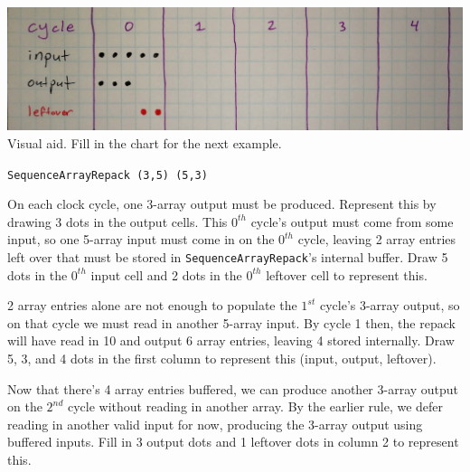 \documentclass[12pt]{article}
\begin{document}
\begin{center}
\includegraphics[width=1.0\linewidth]{Figures/sorry-if-patronizing.jpg}
Visual aid. Fill in the chart for the next example.

\texttt{SequenceArrayRepack (3,5) (5,3)}
\end{center}

On each clock cycle, one 3-array output must be produced. Represent
this by drawing 3 dots in the output cells. This $0^{th}$ cycle's
output must come from some input, so one 5-array input must come in
on the $0^{th}$ cycle, leaving 2 array entries left over that must
be stored in \texttt{SequenceArrayRepack}'s internal buffer. Draw
5 dots in the $0^{th}$ input cell and 2 dots in the $0^{th}$
leftover cell to represent this.

2 array entries alone are not enough to populate the $1^{st}$ cycle's
3-array output, so on that cycle we must read in another 5-array
input. By cycle 1 then, the repack will have read in 10 and output 6
array entries, leaving 4 stored internally. Draw 5, 3, and 4 dots in
the first column to represent this (input, output, leftover).

Now that there's 4 array entries buffered, we can produce another
3-array output on the $2^{nd}$ cycle without reading in another array.
By the earlier rule, we defer reading in another valid input for now,
producing the 3-array output using buffered inputs. Fill in 3 output
dots and 1 leftover dots in column 2 to represent this.
\end{document}
